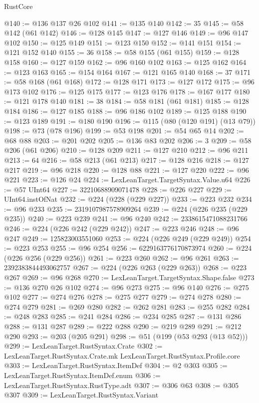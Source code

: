 \begin{lexlean}{RustCore}
\begin{coremodule}
@140 := @136 @137 @26 @102
@141 := @135 @140
@142 := 35
@145 := @58 @142 (@61 @142)
@146 := @128 @145
@147 := @127 @146
@149 := @96 @147 @102
@150 := @125 @149
@151 := @123 @150
@152 := @141 @151
@154 := @121 @152 @140
@155 := 36
@158 := @58 @155 (@61 @155)
@159 := @128 @158
@160 := @127 @159
@162 := @96 @160 @102
@163 := @125 @162
@164 := @123 @163
@165 := @154 @164
@167 := @121 @165 @140
@168 := 37
@171 := @58 @168 (@61 @168)
@172 := @128 @171
@173 := @127 @172
@175 := @96 @173 @102
@176 := @125 @175
@177 := @123 @176
@178 := @167 @177
@180 := @121 @178 @140
@181 := 38
@184 := @58 @181 (@61 @181)
@185 := @128 @184
@186 := @127 @185
@188 := @96 @186 @102
@189 := @125 @188
@190 := @123 @189
@191 := @180 @190
@196 := @115 (@80 (@120 @191) (@13 @79))
@198 := @73 (@78 @196)
@199 := @53 @198
@201 := @54 @65 @14
@202 := @68 @88
@203 := @201 @202
@205 := @136 @83 @202
@206 := 3
@209 := @58 @206 (@61 @206)
@210 := @128 @209
@211 := @127 @210
@212 := @96 @211
@213 := 64
@216 := @58 @213 (@61 @213)
@217 := @128 @216
@218 := @127 @217
@219 := @96 @218
@220 := @128 @88
@221 := @127 @220
@222 := @96 @221
@223 := @126 @24
@224 := LexLeanTarget.TargetSyntax.Value.u64
@226 := @57 UInt64
@227 := 32210688909071478
@228 := @226 @227
@229 := UInt64.instOfNat
@232 := @224 (@228 (@229 @227))
@233 := @223 @232
@234 := @96 @233
@235 := 2319107987578909264
@239 := @224 (@226 @235 (@229 @235))
@240 := @223 @239
@241 := @96 @240
@242 := 2338615471088231766
@246 := @224 (@226 @242 (@229 @242))
@247 := @223 @246
@248 := @96 @247
@249 := 125823003551060
@253 := @224 (@226 @249 (@229 @249))
@254 := @223 @253
@255 := @96 @254
@256 := 6229163776170873974
@260 := @224 (@226 @256 (@229 @256))
@261 := @223 @260
@262 := @96 @261
@263 := 2392383844493062757
@267 := @224 (@226 @263 (@229 @263))
@268 := @223 @267
@269 := @96 @268
@270 := LexLeanTarget.TargetSyntax.Shape.false
@273 := @136 @270 @26 @102
@274 := @96 @273
@275 := @96 @140
@276 := @275 @102
@277 := @274 @276
@278 := @275 @277
@279 := @274 @278
@280 := @274 @279
@281 := @269 @280
@282 := @262 @281
@283 := @255 @282
@284 := @248 @283
@285 := @241 @284
@286 := @234 @285
@287 := @131 @286
@288 := @131 @287
@289 := @222 @288
@290 := @219 @289
@291 := @212 @290
@293 := @203 (@205 @291)
@298 := @51 (@199 (@53 @293 (@13 @52)))
@299 := LexLeanTarget.RustSyntax.Crate
@302 := LexLeanTarget.RustSyntax.Crate.mk LexLeanTarget.RustSyntax.Profile.core
@303 := LexLeanTarget.RustSyntax.ItemDef
@304 := @2 @303
@305 := LexLeanTarget.RustSyntax.ItemDef.enum
@306 := LexLeanTarget.RustSyntax.RustType.adt
@307 := @306 @63
@308 := @305 @307
@309 := LexLeanTarget.RustSyntax.Variant

\end{coremodule}
\end{lexlean}

